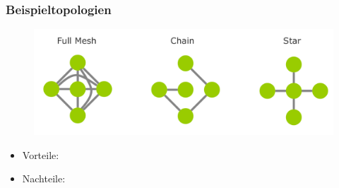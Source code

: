 \documentclass[xcolor=dvipsnames, aspectratio=169]{beamer}
\begin{document}
\begin{frame}
	\frametitle{Beispieltopologien}
	\begin{figure}
	\center
		\includegraphics[scale=0.20]{topologie}
	\end{figure}
	\begin{itemize}
		\item Vorteile:
		\item Nachteile:
	\end{itemize}
\end{frame}
\end{document}
